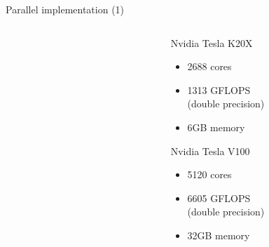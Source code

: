 \documentclass[10pt,aspectratio=169,dvipsnames]{beamer} %
\begin{document}
\begin{frame}{Parallel implementation (1)}
	\begin{columns}[T]
		\begin{column}{0.4\textwidth}
			\begin{figure}
			\end{figure}
		\end{column}
		\begin{column}{0.6\textwidth}
			\begin{minipage}[c]{0.47\textwidth}
				Nvidia Tesla K20X
				\begin{itemize}
					\item 2688 cores
					\item 1313 GFLOPS \\(double precision)
					\item 6GB memory
				\end{itemize}	
			\end{minipage}
			\begin{minipage}[c]{0.47\textwidth}
				Nvidia Tesla V100
				\begin{itemize}
					\item 5120 cores
					\item 6605 GFLOPS \\(double precision)
					\item 32GB memory
				\end{itemize}	
			\end{minipage}
		\begin{figure}
		\end{figure}
		\end{column}
	\end{columns}	
\end{frame}
\end{document}
